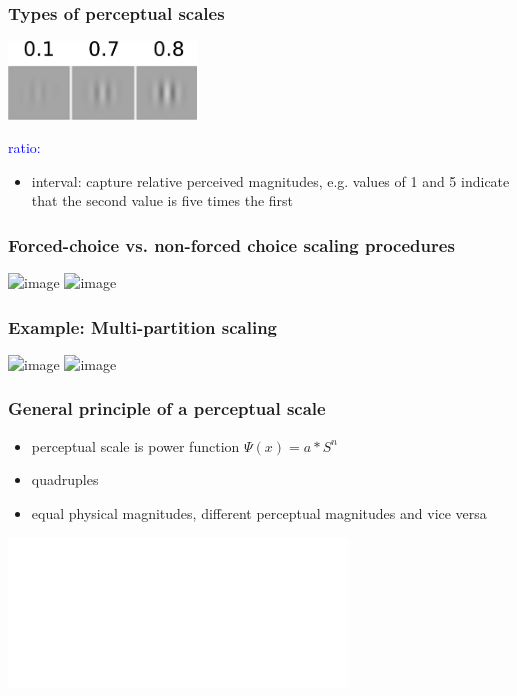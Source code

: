 \documentclass[]{beamer}
\begin{document}
\begin{frame}
 \frametitle{Types of perceptual scales}
\begin{overlayarea}{110mm}{60mm}
\begin{center}
\includegraphics[width=50mm]{figs/l6/three_contrasts.png} 
\end{center}

\textcolor{blue}{ratio:}
\begin{itemize}
 \item interval: capture relative perceived magnitudes, e.g. values of 1 and 5 indicate that the second value is five times the first 
\end{itemize}
\end{overlayarea}
\end{frame}


\begin{frame}
 \frametitle{Forced-choice vs. non-forced choice scaling procedures}
\begin{center}
\includegraphics<1>[width=90mm]{figs/l6/appearance_fc.png} 
\includegraphics<2>[width=90mm]{figs/l6/appearance_nonfc.png} 
\end{center}
\end{frame}

\begin{frame}
 \frametitle{Example: Multi-partition scaling}
\begin{center}
\includegraphics<1>[width=70mm]{figs/l6/whittle_display.png} 
\includegraphics<2>[width=70mm]{figs/l6/whittle_scale.png} 
\end{center}
\end{frame}



\begin{frame}
 \frametitle{General principle of a perceptual scale}
 
\begin{itemize}
 \item perceptual scale is power function $\Psi(x) = a*S^n$
 \item quadruples
 \item equal physical magnitudes, different perceptual magnitudes and vice versa
\end{itemize}

\begin{center}
\includegraphics<1>[width=90mm]{figs/l6/scale_power_function.pdf} 
\end{center}
\end{frame}
\end{document}
